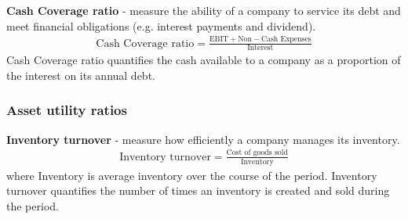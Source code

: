 \textbf{Cash Coverage ratio} - measure the ability of a company to service its debt and meet financial obligations (e.g. interest payments and dividend).
\begin{gather}
    \textrm{Cash Coverage ratio} = \frac{\textrm{EBIT} + \textrm{Non}-\textrm{Cash Expenses}}{\textrm{Interest}}
\end{gather}
Cash Coverage ratio quantifies the cash available to a company as a proportion of the interest on its annual debt.
\subsubsection{Asset utility ratios}
\textbf{Inventory turnover} - measure how efficiently a company manages its inventory.
\begin{gather}
    \textrm{Inventory turnover} = \frac{\textrm{Cost of goods sold}}{\textrm{Inventory}}
\end{gather}
where Inventory is average inventory over the course of the period. Inventory turnover quantifies the number of times an inventory is created and sold during the period.